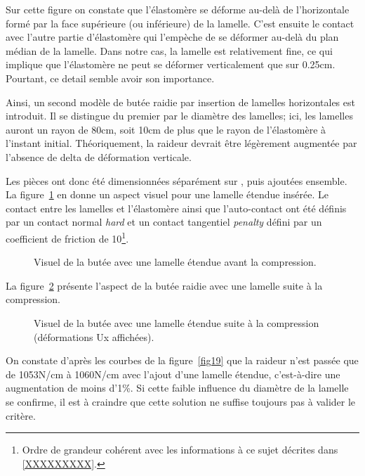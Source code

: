 ﻿\documentclass{article}
\newcommand{\abaqus}{\bsc{Abaqus}\xspace}
\begin{document}
Sur cette figure on constate que l'élastomère se déforme au-delà de l'horizontale formé par la face supérieure (ou inférieure) de la lamelle. C'est ensuite le contact avec l'autre partie d'élastomère qui l'empèche de se déformer au-delà du plan médian de la lamelle. Dans notre cas, la lamelle est relativement fine, ce qui implique que l'élastomère ne peut se déformer verticalement que sur 0.25cm. Pourtant, ce detail semble avoir son importance.

Ainsi, un second modèle de butée raidie par insertion de lamelles horizontales est introduit. Il se distingue du premier par le diamètre des lamelles; ici, les lamelles auront un rayon de 80cm, soit 10cm de plus que le rayon de l'élastomère à l'instant initial. Théoriquement, la raideur devrait être légèrement augmentée par l'absence de delta de déformation verticale.

Les pièces ont donc été dimensionnées séparément sur \abaqus, puis ajoutées ensemble. La figure~\ref{fig17} en donne un aspect visuel pour une lamelle étendue insérée. Le contact entre les lamelles et l'élastomère ainsi que l'auto-contact ont été définis par un contact normal \textit{hard} et un contact tangentiel \textit{penalty} défini par un coefficient de friction de 10\footnote{Ordre de grandeur cohérent avec les informations à ce sujet décrites dans \ref{XXXXXXXXX}.}.

\begin{figure}[!h]
	\centering
	\caption{Visuel de la butée avec une lamelle étendue avant la compression.}
	\label{fig17}
\end{figure}

La figure~\ref{fig18} présente l'aspect de la butée raidie avec une lamelle suite à la compression.

\begin{figure}[!h]
	\centering
	\caption{Visuel de la butée avec une lamelle étendue suite à la compression (déformations Ux affichées).}
	\label{fig18}
\end{figure}

On constate d'après les courbes de la figure~\ref{fig19} que la raideur n'est passée que de 1053N/cm à 1060N/cm avec l'ajout d'une lamelle étendue, c'est-à-dire une augmentation de moins d'1\%. Si cette faible influence du diamètre de la lamelle se confirme, il est à craindre que cette solution ne suffise toujours pas à valider le critère.
\end{document}
